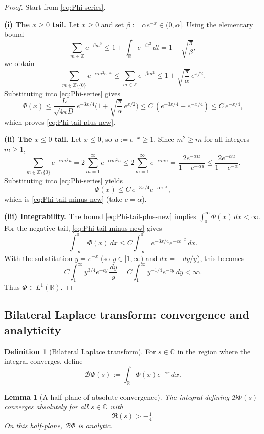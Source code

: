 \documentclass[12pt]{amsart}
\newtheorem{lemma}[theorem]{Lemma}
\theoremstyle{definition}
\newtheorem{definition}[theorem]{Definition}
\theoremstyle{remark}
\begin{document}
\begin{proof}
Start from \eqref{eq:Phi-series}.

\smallskip
\noindent\textbf{(i) The $x\ge0$ tail.}
Let $x\ge 0$ and set $\beta:=\alpha e^{-x}\in(0,\alpha]$. Using the elementary bound
\[
\sum_{m\in\mathbb Z} e^{-\beta m^2}
\le
1+\int_{\mathbb R} e^{-\beta t^2}\,dt
=
1+\sqrt{\frac{\pi}{\beta}},
\]
we obtain
\[
\sum_{m\in\mathbb Z\setminus\{0\}} e^{-\alpha m^2 e^{-x}}
\le
\sum_{m\in\mathbb Z} e^{-\beta m^2}
\le
1+\sqrt{\frac{\pi}{\alpha}}\,e^{x/2}.
\]
Substituting into \eqref{eq:Phi-series} gives
\[
\Phi(x)
\le
\frac{L}{\sqrt{4\pi D}}\,e^{-3x/4}\Big(1+\sqrt{\frac{\pi}{\alpha}}\,e^{x/2}\Big)
\le
C\,(e^{-3x/4}+e^{-x/4})
\le
C\,e^{-x/4},
\]
which proves \eqref{eq:Phi-tail-plus-new}.

\smallskip
\noindent\textbf{(ii) The $x\le0$ tail.}
Let $x\le 0$, so $u:=e^{-x}\ge 1$. Since $m^2\ge m$ for all integers $m\ge1$,
\[
\sum_{m\in\mathbb Z\setminus\{0\}} e^{-\alpha m^2 u}
=
2\sum_{m=1}^\infty e^{-\alpha m^2 u}
\le
2\sum_{m=1}^\infty e^{-\alpha m u}
=
\frac{2e^{-\alpha u}}{1-e^{-\alpha u}}
\le
\frac{2e^{-\alpha u}}{1-e^{-\alpha}}.
\]
Substituting into \eqref{eq:Phi-series} yields
\[
\Phi(x)\le C\,e^{-3x/4}e^{-\alpha e^{-x}},
\]
which is \eqref{eq:Phi-tail-minus-new} (take $c=\alpha$).

\smallskip
\noindent\textbf{(iii) Integrability.}
The bound \eqref{eq:Phi-tail-plus-new} implies $\int_0^\infty \Phi(x)\,dx<\infty$.
For the negative tail, \eqref{eq:Phi-tail-minus-new} gives
\[
\int_{-\infty}^0 \Phi(x)\,dx
\le
C\int_{-\infty}^0 e^{-3x/4}e^{-c e^{-x}}\,dx.
\]
With the substitution $y=e^{-x}$ (so $y\in[1,\infty)$ and $dx=-dy/y$), this becomes
\[
C\int_1^\infty y^{3/4}e^{-cy}\,\frac{dy}{y}
=
C\int_1^\infty y^{-1/4}e^{-cy}\,dy
<
\infty.
\]
Thus $\Phi\in L^1(\mathbb R)$.
\end{proof}

\subsection{Bilateral Laplace transform: convergence and analyticity}
\label{subsec:bilaplace}

\begin{definition}[Bilateral Laplace transform]
\label{def:bilaplace}
For $s\in\mathbb C$ in the region where the integral converges, define
\[
\mathcal B\Phi(s)
:=
\int_{\mathbb R}\Phi(x)e^{-s x}\,dx.
\]
\end{definition}

\begin{lemma}[A half-plane of absolute convergence]
\label{lem:bilaplace-halfplane}
The integral defining $\mathcal B\Phi(s)$ converges absolutely for all $s\in\mathbb C$ with
\[
\Re(s)>-\tfrac14.
\]
On this half-plane, $\mathcal B\Phi$ is analytic.
\end{lemma}
\end{document}

